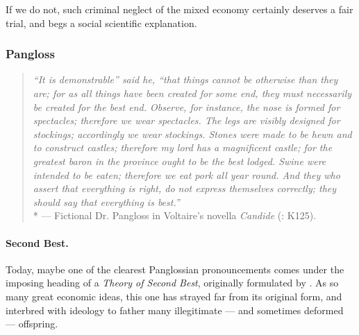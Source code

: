 If we do not, such criminal neglect of the mixed economy certainly deserves a fair trial, and begs a social scientific explanation.


\subsubsection{Pangloss} \label{sec:Pangloss}

\begin{quote}
	\emph{``It is demonstrable'' said he, ``that things cannot be otherwise than they are; for as all things have been created for some end, they must necessarily be created for the best end. Observe, for instance, the nose is formed for spectacles; therefore we wear spectacles. The legs are visibly designed for stockings; accordingly we wear stockings. Stones were made to be hewn and to construct castles; therefore my lord has a magnificent castle; for the greatest baron in the province ought to be the best lodged. Swine were intended to be eaten; therefore we eat pork all year round. And they who assert that everything is right, do not express themselves correctly; they should say that everything is best.''}\\*
	--- Fictional Dr. Pangloss in Voltaire's novella \emph{Candide} (\citeyear{Voltaire1759}: K125).
\end{quote}

\paragraph{Second Best.} Today, maybe one of the clearest Panglossian pronouncements comes under the imposing heading of a \emph{Theory of Second Best}, originally formulated by \cite{Lancaster1956}. As so many great economic ideas, this one has strayed far from its original form, and interbred with ideology to father many illegitimate --- and sometimes  deformed --- offspring. 

